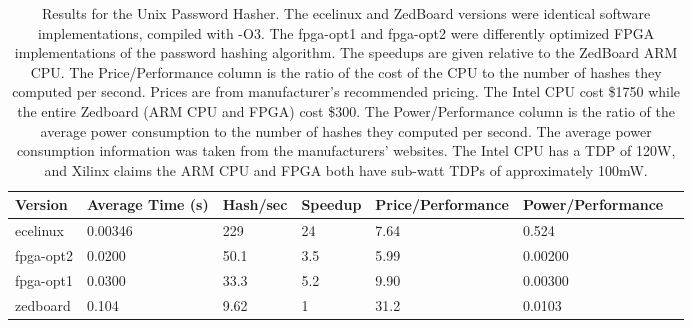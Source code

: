 \begin{table}[h]
\centering
\begin{tabular}{@{}lllllll@{}}
\toprule
  Version   & Average Time (s) & Hash/sec & Speedup & Price/Performance & Power/Performance \\ \midrule
  ecelinux  & 0.00346          & 229      & 24      & 7.64  & 0.524                         \\
  fpga-opt2 & 0.0200           & 50.1     & 3.5     & 5.99  & 0.00200                       \\
  fpga-opt1 & 0.0300           & 33.3     & 5.2     & 9.90  & 0.00300                       \\
  zedboard  & 0.104            & 9.62     & 1       & 31.2  & 0.0103                        \\ \bottomrule
\end{tabular}
\caption {Results for the Unix Password Hasher. The ecelinux and ZedBoard versions were identical software
  implementations, compiled with -O3. The fpga-opt1 and fpga-opt2 were differently optimized FPGA
  implementations of the password hashing algorithm. The speedups are given relative to the ZedBoard ARM
  CPU. The Price/Performance column is the ratio of the cost of the CPU to the number of hashes they computed
  per second. Prices are from manufacturer's recommended pricing. The Intel CPU cost \$1750 while the
  entire Zedboard (ARM CPU and FPGA) cost \$300. The Power/Performance column is the ratio of the average
  power consumption to the number of hashes they computed per second. The average power consumption
  information was taken from the manufacturers' websites. The Intel CPU has a TDP of 120W, and Xilinx 
  claims the ARM CPU and FPGA both have sub-watt TDPs of approximately 100mW.}
\label{table:hashresults}
\end{table}

